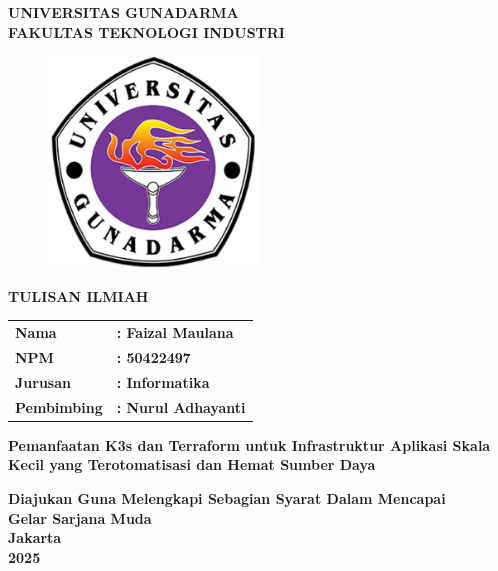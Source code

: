 \begin{center}
  \textbf{UNIVERSITAS GUNADARMA} \\
  \textbf{FAKULTAS TEKNOLOGI INDUSTRI}
\end{center}

\begin{figure}[h]
  \centering
  \includegraphics[width=0.5\textwidth]{assets/logo-gunadarma.png}
\end{figure}

\begin{center}
  \textbf{TULISAN ILMIAH}
\end{center}

\begin{table}[H]
  \centering
  \begin{tabular}{l l}  %
    \textbf{Nama}       & \textbf{: Faizal Maulana}  \\
    \textbf{NPM}        & \textbf{: 50422497}        \\
    \textbf{Jurusan}    & \textbf{: Informatika}     \\
    \textbf{Pembimbing} & \textbf{: Nurul Adhayanti} \\
  \end{tabular}
\end{table}

\begin{center}
  \textbf {Pemanfaatan K3s dan Terraform untuk Infrastruktur Aplikasi Skala Kecil yang Terotomatisasi dan Hemat Sumber Daya}
\end{center}

\begin{center}
  \textbf{Diajukan Guna Melengkapi Sebagian Syarat Dalam Mencapai} \\
  \textbf{Gelar Sarjana Muda} \\
  \textbf{Jakarta} \\
  \textbf{2025}
\end{center}
